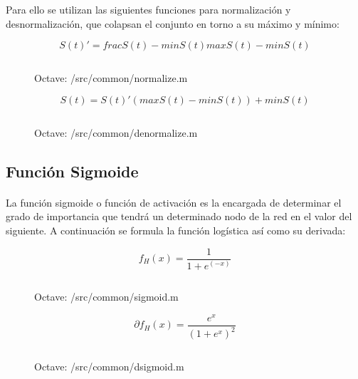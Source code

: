 \documentclass[10pt, a4paper,spanish]{article}
\begin{document}
			Para ello se utilizan las siguientes funciones para normalización y desnormalización, que colapsan el conjunto en torno a su máximo y mínimo:

			\begin{equation}
				S(t)' = frac{S(t) - min S(t)}{max S(t)- min S(t)}
			\end{equation}

			\begin{figure}[htpb!]
				\centering
				\inputminted{octave}{../src/common/normalize.m}
				\caption{Octave: /src/common/normalize.m}
				\label{code:normalize}
			\end{figure}


			\begin{equation}
				S(t) = S(t)' (max S(t)- min S(t)) + min S(t)
			\end{equation}

			\begin{figure}[htpb!]
				\centering
				\inputminted{octave}{../src/common/denormalize.m}
				\caption{Octave: /src/common/denormalize.m}
				\label{code:denormalize}
			\end{figure}

		\subsection{Función Sigmoide}
			\paragraph{}
			La función sigmoide o función de activación es la encargada de determinar el grado de importancia que tendrá un determinado nodo de la red en el valor del siguiente. A continuación se formula la función logística así como su derivada:

			\begin{equation}
				f_H(x) = \frac{1}{1+e^(-x)}
			\end{equation}

			\begin{figure}[htpb!]
				\centering
				\inputminted{octave}{../src/common/sigmoid.m}
				\caption{Octave: /src/common/sigmoid.m}
				\label{code:sigmoid}
			\end{figure}

			\begin{equation}
				\partial f_H(x) = \frac{e^x}{(1 + e^x)^2}
			\end{equation}


			\begin{figure}[htpb!]
				\centering
				\inputminted{octave}{../src/common/dsigmoid.m}
				\caption{Octave: /src/common/dsigmoid.m}
				\label{code:dsigmoid}
			\end{figure}
\end{document}
